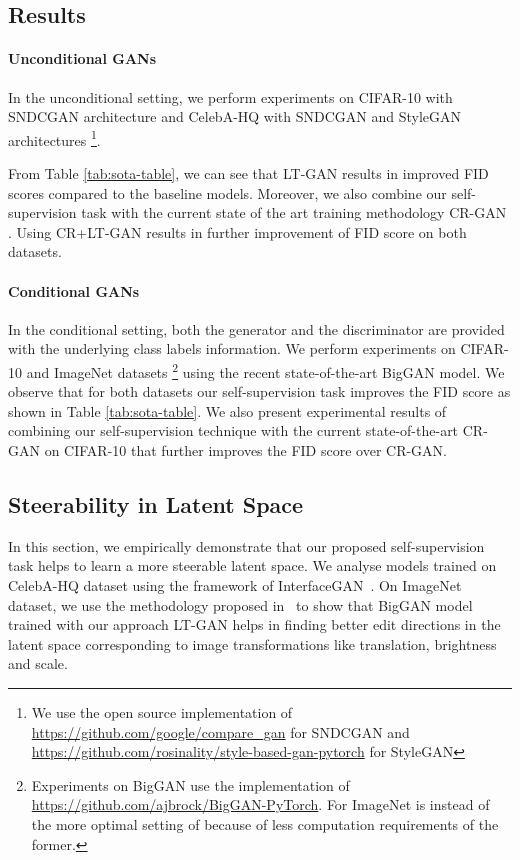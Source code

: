 \documentclass[10pt,twocolumn,letterpaper]{article}
\begin{document}
\subsection{Results}

\paragraph{Unconditional GANs}
In the unconditional setting, we perform experiments on CIFAR-10 with SNDCGAN \cite{sngan_proj} architecture and CelebA-HQ with SNDCGAN and StyleGAN \cite{stylegan2019karras} architectures \footnote{We use the open source implementation of \url{https://github.com/google/compare\_gan} for SNDCGAN and \url{https://github.com/rosinality/style-based-gan-pytorch} for StyleGAN}. 

From Table \ref{tab:sota-table}, we can see that LT-GAN results in improved FID scores compared to the baseline models. Moreover, we also combine our self-supervision task with the current state of the art training methodology CR-GAN \cite{crgan2019chen}. Using CR+LT-GAN results in further improvement of FID score on both datasets.




\paragraph{Conditional GANs}
In the conditional setting, both the generator and the discriminator are provided with the underlying class labels information. We perform experiments on CIFAR-10 and ImageNet datasets \footnote{Experiments on BigGAN use the implementation of  \url{https://github.com/ajbrock/BigGAN-PyTorch}. For ImageNet  is  instead of the more optimal setting of  \cite{biggan2018brock} because of less computation requirements of the former.} using the recent state-of-the-art BigGAN \cite{biggan2018brock} model. We observe that for both datasets our self-supervision task improves the FID score as shown in Table \ref{tab:sota-table}. We also present experimental results of combining our self-supervision technique with the current state-of-the-art CR-GAN \cite{crgan2019chen} on CIFAR-10 that further improves the FID score over CR-GAN.









\subsection{Steerability in Latent Space}
In this section, we empirically demonstrate that our proposed self-supervision task helps to learn a more steerable latent space. We analyse models trained on CelebA-HQ dataset using the framework of InterfaceGAN~\cite{interface2020shen}. On ImageNet dataset, we use the methodology proposed in~\cite{controlling2020iclr} to show that BigGAN model \cite{biggan2018brock} trained with our approach LT-GAN helps in finding better edit directions in the latent space corresponding to image transformations like translation, brightness and scale.
\end{document}
